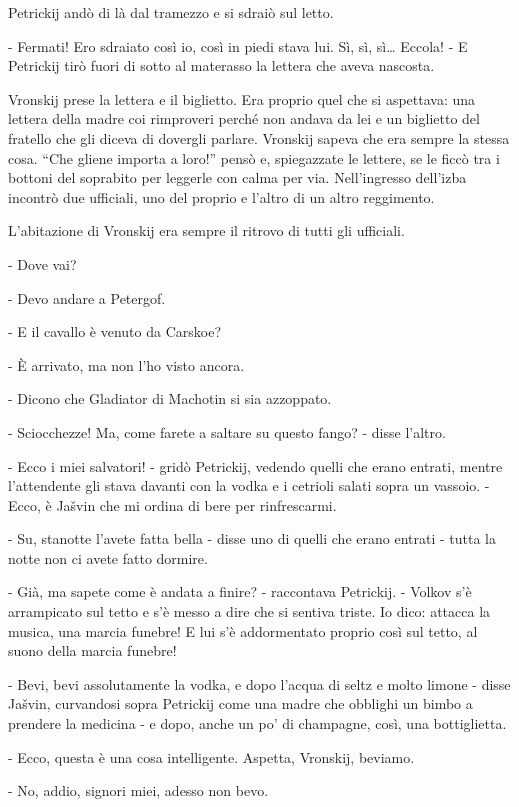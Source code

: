 Petrickij andò di là dal tramezzo e si sdraiò sul letto. 

- Fermati! Ero sdraiato così io, così in piedi stava lui. Sì, sì, sì\ldots{} Eccola! - E Petrickij tirò fuori di sotto al materasso la lettera che aveva nascosta. 

Vronskij prese la lettera e il biglietto. Era proprio quel che si aspettava: una lettera della madre coi rimproveri perché non andava da lei e un biglietto del fratello che gli diceva di dovergli parlare. Vronskij sapeva che era sempre la stessa cosa. ``Che gliene importa a loro!'' pensò e, spiegazzate le lettere, se le ficcò tra i bottoni del soprabito per leggerle con calma per via. Nell'ingresso dell'izba incontrò due ufficiali, uno del proprio e l'altro di un altro reggimento. 

L'abitazione di Vronskij era sempre il ritrovo di tutti gli ufficiali. 

- Dove vai? 

- Devo andare a Petergof. 

- E il cavallo è venuto da Carskoe? 

- È arrivato, ma non l'ho visto ancora. 

- Dicono che Gladiator di Machotin si sia azzoppato. 

- Sciocchezze! Ma, come farete a saltare su questo fango? - disse l'altro. 

- Ecco i miei salvatori! - gridò Petrickij, vedendo quelli che erano entrati, mentre l'attendente gli stava davanti con la vodka e i cetrioli salati sopra un vassoio. - Ecco, è Jašvin che mi ordina di bere per rinfrescarmi. 

- Su, stanotte l'avete fatta bella - disse uno di quelli che erano entrati - tutta la notte non ci avete fatto dormire. 

- Già, ma sapete come è andata a finire? - raccontava Petrickij. - Volkov s'è arrampicato sul tetto e s'è messo a dire che si sentiva triste. Io dico: attacca la musica, una marcia funebre! E lui s'è addormentato proprio così sul tetto, al suono della marcia funebre! 

- Bevi, bevi assolutamente la vodka, e dopo l'acqua di seltz e molto limone - disse Jašvin, curvandosi sopra Petrickij come una madre che obblighi un bimbo a prendere la medicina - e dopo, anche un po' di champagne, così, una bottiglietta. 

- Ecco, questa è una cosa intelligente. Aspetta, Vronskij, beviamo. 

- No, addio, signori miei, adesso non bevo. 

